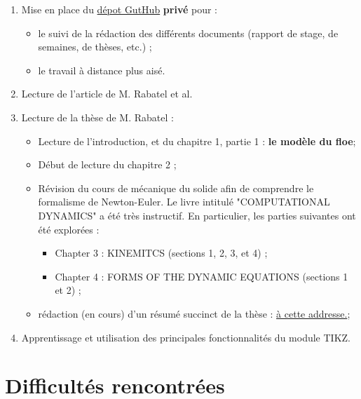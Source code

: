 \documentclass[
  french,
	11pt, %
]{fphw}
\begin{document}
\begin{enumerate}
  \item Mise en place du \href{https://github.com/desmond-rn/ice-floes}{dépot GutHub} \textbf{privé} pour : 
  \begin{itemize}
    \item le suivi de la rédaction des différents documents (rapport de stage, de semaines, de thèses, etc.) ;
    \item le travail à distance plus aisé.
  \end{itemize}
  \item Lecture de l'article de M. Rabatel et al. \parencite{rabatel2015dynamics}
  \item Lecture de la thèse de M. Rabatel \parencite{rabatel2015thesis}:
  \begin{itemize}
    \item Lecture de l'introduction, et du chapitre 1, partie 1 : \textbf{le modèle du floe};
    \item Début de lecture du chapitre 2 ;
    \item Révision du cours de mécanique du solide afin de comprendre le formalisme de Newton-Euler. Le livre intitulé "COMPUTATIONAL DYNAMICS" \parencite{shabana2009computational} a été très instructif. En particulier, les parties suivantes ont été explorées :
    \begin{itemize}
      \item Chapter 3 : KINEMITCS (sections 1, 2, 3, et 4) ;
      \item Chapter 4 : FORMS OF THE DYNAMIC EQUATIONS (sections 1 et 2) ;
    \end{itemize}
    \item rédaction (en cours) d'un résumé succinct de la thèse : \href{https://github.com/desmond-rn/ice-floes/blob/master/reports/matthias/main.pdf}{à cette addresse.}; 
  \end{itemize}
  \item Apprentissage et utilisation des principales fonctionnalités du module TIKZ.   
\end{enumerate}


\section{Difficultés rencontrées}
\end{document}
